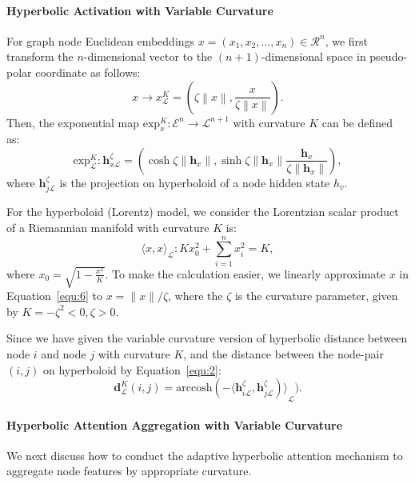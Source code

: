 \paragraph{Hyperbolic Activation with Variable Curvature}
For graph node Euclidean embeddings $x = (x_1, x_2, \dots, x_n) \in \mathcal{R}^{n} $, we first transform the $n$-dimensional vector to the $(n+1)$-dimensional space in pseudo-polar coordinate as follows:
\begin{equation}\label{equ:7}
    x \rightarrow x_{\mathcal{L}}^{K} = (\zeta \left\|x\right\|,\frac{x}{\zeta \left\|x\right\|}).
\end{equation}
Then, the exponential map $\mathrm{exp}^{K}_{x}:\mathcal{E}^n \rightarrow \mathcal{L}^{n+1}$ with curvature $K$ can be defined as: 
\begin{equation}\label{equ:11}
    \mathrm{exp}^{K}_{\mathcal{L}}: \mathbf{h}^{\zeta}_{x \mathcal{L}}=(\cosh{\zeta \left\|\mathbf{h}_x\right\|}, \sinh{\zeta \left\|\mathbf{h}_x\right\|} \frac{\mathbf{h}_x}{\zeta \left\|\mathbf{h}_x\right\|}), 
\end{equation}
where $\mathbf{h}^{\zeta}_{j \mathcal{L}}$ is the projection on hyperboloid of a node hidden state $h_v$. 

For the hyperboloid (Lorentz) model, we consider the Lorentzian scalar product of a Riemannian manifold with curvature $K$ is:
\begin{equation}\label{equ:6}
    \langle x,x \rangle_\mathcal{L} : K x_0^2 + \sum_{i=1}^{n}{x_i^2} = K, 
\end{equation}
where $x_0 = \sqrt{1-\frac{x^2}{K}}$. 
To make the calculation easier, we linearly approximate $x$ in Equation~\eqref{equ:6} to $x = \|x\|/\zeta$, where the $\zeta$ is the curvature parameter, given by $K = -\zeta^2 < 0, \zeta > 0$.

Since we have given the variable curvature version of hyperbolic distance between node $i$ and node $j$ with curvature $K$, and the distance between the node-pair $(i, j)$ on hyperboloid by Equation~\eqref{equ:2}:
\begin{equation}\label{equ:Hdist}
    \mathbf{d}^{K}_{\mathcal{L}}(i,j) = \mathrm{arccosh}{(- \langle \mathbf{h}^{\zeta}_{i \mathcal{L}},\mathbf{h}^{\zeta}_{j \mathcal{L}})\rangle}_{\mathcal{L}}).
\end{equation}

\paragraph{Hyperbolic Attention Aggregation with Variable Curvature}
We next discuss how to conduct the adaptive hyperbolic attention mechanism to aggregate node features by appropriate curvature. 

